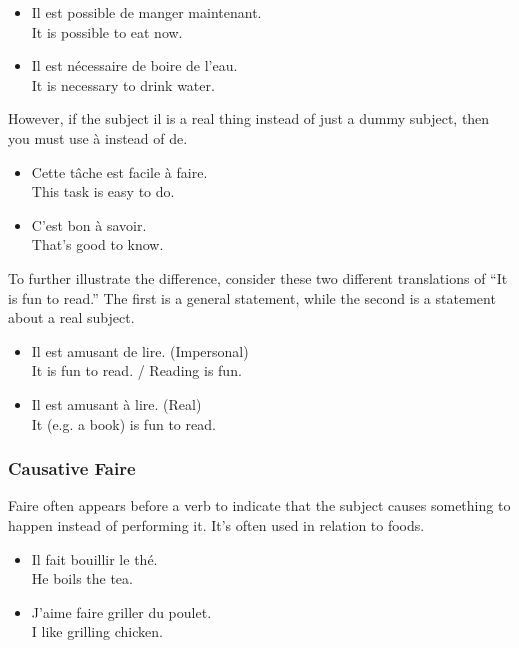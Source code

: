 \begin{itemize}
    \begin{itemize}
       \item  Il est possible de manger maintenant. \\ It is possible to eat now.
       \item  Il est n{\'e}cessaire de boire de l'eau. \\ It is necessary to drink water.
    \end{itemize}
    However, if the subject il is a real thing instead of just a dummy subject, then you must use {\`a} instead of de.
    \begin{itemize}
       \item  Cette t{\^a}che est facile {\`a} faire. \\ This task is easy to do.
       \item  C'est bon {\`a} savoir. \\ That's good to know.
    \end{itemize}
    To further illustrate the difference, consider these two different translations of ``It is fun to read.'' The first is a general statement, while the second is a statement about a real subject.
    \begin{itemize}
       \item  Il est amusant de lire. (Impersonal) \\ It is fun to read. / Reading is fun.
       \item  Il est amusant {\`a} lire. (Real) \\ It (e.g. a book) is fun to read.
    \end{itemize}
\end{itemize}

\subsubsection{Causative Faire}

Faire often appears before a verb to indicate that the subject causes something to happen instead of performing it. It's often used in relation to foods.

\begin{itemize}
  \item  Il fait bouillir le th{\'e}. \\ He boils the tea.
  \item  J'aime faire griller du poulet. \\ I like grilling chicken.
\end{itemize}

